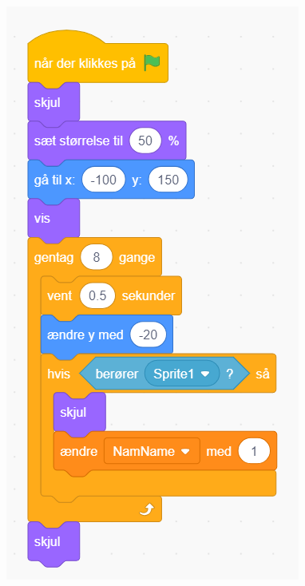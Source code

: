\documentclass{article}
\begin{document}
\begin{figure}[h]
	\includegraphics[scale=0.2]{4billede.png}
\end{figure}
\end{document}
